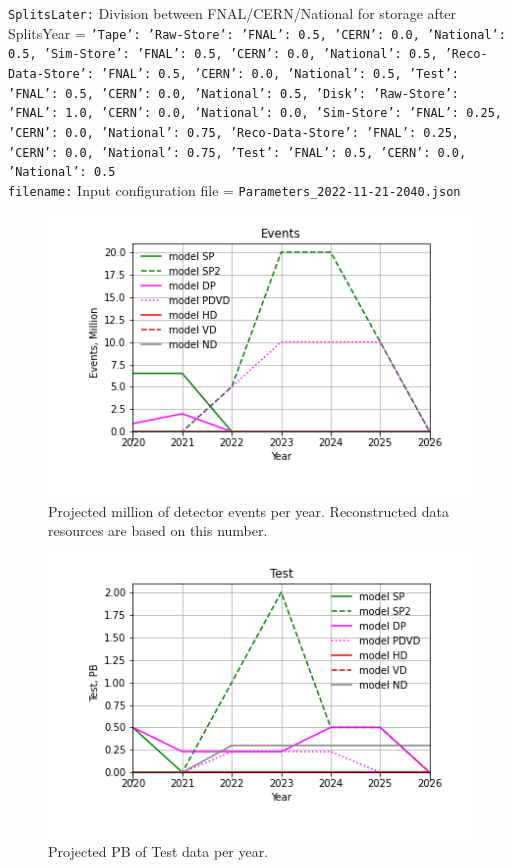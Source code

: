 {\tt SplitsLater:} Division between FNAL/CERN/National for storage after SplitsYear = {\tt {'Tape': {'Raw-Store': {'FNAL': 0.5, 'CERN': 0.0, 'National': 0.5}, 'Sim-Store': {'FNAL': 0.5, 'CERN': 0.0, 'National': 0.5}, 'Reco-Data-Store': {'FNAL': 0.5, 'CERN': 0.0, 'National': 0.5}, 'Test': {'FNAL': 0.5, 'CERN': 0.0, 'National': 0.5}}, 'Disk': {'Raw-Store': {'FNAL': 1.0, 'CERN': 0.0, 'National': 0.0}, 'Sim-Store': {'FNAL': 0.25, 'CERN': 0.0, 'National': 0.75}, 'Reco-Data-Store': {'FNAL': 0.25, 'CERN': 0.0, 'National': 0.75}, 'Test': {'FNAL': 0.5, 'CERN': 0.0, 'National': 0.5}}}} \\
{\tt filename:} Input configuration file = {\tt Parameters\_2022-11-21-2040.json} \\
\begin{figure}[h]
\centering\includegraphics[height=0.4\textwidth]{Parameters_2022-11-21-2026/Parameters_2022-11-21-2026-Events.png}
\caption{Projected million of detector events per year.  Reconstructed data resources are based on this number.}
\label{fig:Events}
\end{figure}
\begin{figure}[h]
\centering\includegraphics[height=0.4\textwidth]{Parameters_2022-11-21-2026/Parameters_2022-11-21-2026-Test.png}
\caption{Projected PB of Test data per year.}
\label{fig:Test}
\end{figure}

